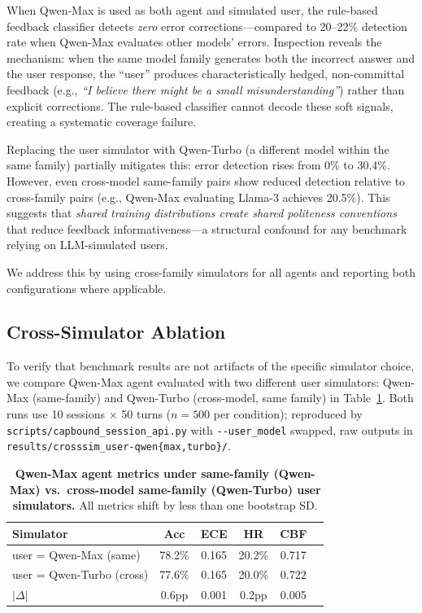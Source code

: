 \documentclass[11pt]{article}
\begin{document}
When Qwen-Max is used as both agent and simulated user, the rule-based feedback classifier detects \emph{zero} error corrections---compared to 20--22\% detection rate when Qwen-Max evaluates other models' errors. Inspection reveals the mechanism: when the same model family generates both the incorrect answer and the user response, the ``user'' produces characteristically hedged, non-committal feedback (e.g., \emph{``I believe there might be a small misunderstanding''}) rather than explicit corrections. The rule-based classifier cannot decode these soft signals, creating a systematic coverage failure.

Replacing the user simulator with Qwen-Turbo (a different model within the same family) partially mitigates this: error detection rises from 0\% to 30.4\%. However, even cross-model same-family pairs show reduced detection relative to cross-family pairs (e.g., Qwen-Max evaluating Llama-3 achieves 20.5\%). This suggests that \emph{shared training distributions create shared politeness conventions} that reduce feedback informativeness---a structural confound for any benchmark relying on LLM-simulated users.

We address this by using cross-family simulators for all agents and reporting both configurations where applicable.



\subsection{Cross-Simulator Ablation}
\label{app:cross_sim}

To verify that benchmark results are not artifacts of the specific simulator choice, we compare Qwen-Max agent evaluated with two different user simulators: Qwen-Max (same-family) and Qwen-Turbo (cross-model, same family) in Table~\ref{tab:cross_sim_ablation}. Both runs use 10 sessions $\times$ 50 turns ($n{=}500$ per condition); reproduced by \texttt{scripts/capbound\_session\_api.py} with \texttt{-{}-user\_model} swapped, raw outputs in \texttt{results/crosssim\_user-qwen\{max,turbo\}/}.

\begin{table}[h]
\centering
\small
\caption{\textbf{Qwen-Max agent metrics under same-family (Qwen-Max) vs.\ cross-model same-family (Qwen-Turbo) user simulators.} All metrics shift by less than one bootstrap SD.}
\label{tab:cross_sim_ablation}
\begin{tabular}{lccccc}
\toprule
\textbf{Simulator} & \textbf{Acc} & \textbf{ECE} & \textbf{HR} & \textbf{CBF} \\
\midrule
user = Qwen-Max (same)   & 78.2\% & 0.165 & 20.2\% & 0.717 \\
user = Qwen-Turbo (cross) & 77.6\% & 0.165 & 20.0\% & 0.722 \\
\midrule
$|\Delta|$ & 0.6pp & 0.001 & 0.2pp & 0.005 \\
\bottomrule
\end{tabular}
\end{table}
\end{document}

